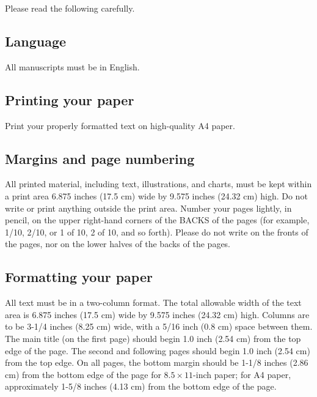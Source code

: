 \documentclass[10pt,twocolumn]{IEEEtran}
\begin{document}
Please read the following carefully.

\subsection{Language}

All manuscripts must be in English.

\subsection{Printing your paper}

Print your properly formatted text on high-quality A4 paper.

\subsection{Margins and page numbering}

All printed material, including text, illustrations, and charts,
must be kept within a print area 6.875 inches (17.5 cm) wide by
9.575 inches (24.32 cm) high. Do not write or print anything
outside the print area. Number your pages lightly, in pencil, on
the upper right-hand corners of the BACKS of the pages (for
example, 1/10, 2/10, or 1 of 10, 2 of 10, and so forth). Please do
not write on the fronts of the pages, nor on the lower halves of
the backs of the pages.


\subsection{Formatting your paper}

All text must be in a two-column format. The total allowable width
of the text area is 6.875 inches (17.5 cm) wide by 9.575 inches
(24.32 cm) high. Columns are to be 3-1/4 inches (8.25 cm) wide,
with a 5/16 inch (0.8 cm) space between them. The main title (on
the first page) should begin 1.0 inch (2.54 cm) from the top edge
of the page. The second and following pages should begin 1.0 inch
(2.54 cm) from the top edge. On all pages, the bottom margin
should be 1-1/8 inches (2.86 cm) from the bottom edge of the page
for $8.5 \times 11$-inch paper; for A4 paper, approximately 1-5/8
inches (4.13 cm) from the bottom edge of the page.
\end{document}
